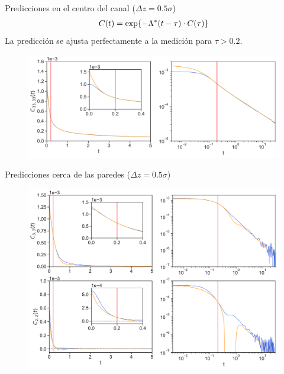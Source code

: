 \documentclass{beamer}
\begin{document}
\begin{frame}{Predicciones en el centro del canal ($\Delta z=0.5\sigma$)}
  \begin{align}
    C(t) = {\rm exp}\{-\Lambda^*(t-\tau)\cdot C(\tau)\}
    \nonumber
  \end{align}
La {\color{orange} predicción} se ajusta perfectamente a la {\color{blue} medición} para $\tau>0.2$.
  
\begin{figure}[h!]
\includegraphics[width=\linewidth]{Predictions-canal-WALLS-66nodes-defense}
\end{figure}
\end{frame}

\begin{frame}{Predicciones cerca de las paredes ($\Delta z=0.5\sigma$)}
\begin{figure}[h!]
\includegraphics[width=\linewidth]{Predictions-WALLS-66nodes-defense}
\end{figure}
\end{frame}
\end{document}
